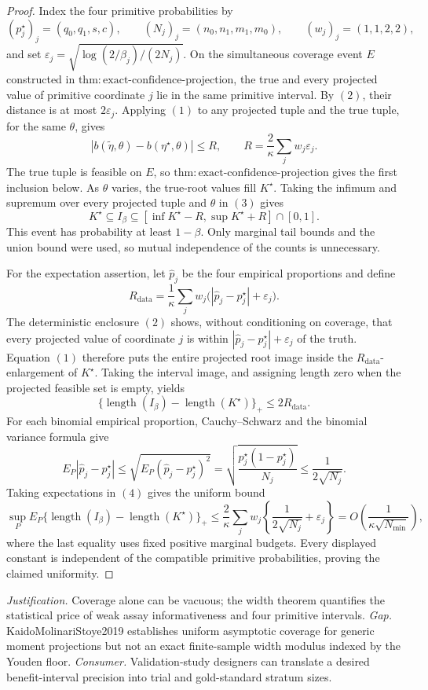 \documentclass{article}
\begin{document}
\begin{proof}
Index the four primitive probabilities by
\[
(p_j^\star)_j=(q_0,q_1,s,c),
\qquad
(N_j)_j=(n_0,n_1,m_1,m_0),
\qquad
(w_j)_j=(1,1,2,2),
\]
and set \(\varepsilon_j=\sqrt{\log(2/\beta_j)/(2N_j)}\). On the simultaneous coverage event \(E\) constructed in \(\mathrm{thm:exact\text{-}confidence\text{-}projection}\), the true and every projected value of primitive coordinate \(j\) lie in the same primitive interval. By \((2)\), their distance is at most \(2\varepsilon_j\). Applying \((1)\) to any projected tuple and the true tuple, for the same \(\theta\), gives
\[
|b(\widetilde\eta,\theta)-b(\eta^\star,\theta)|
\leq R,
\qquad
R=\frac2\kappa\sum_jw_j\varepsilon_j.
\tag{3}
\]
The true tuple is feasible on \(E\), so \(\mathrm{thm:exact\text{-}confidence\text{-}projection}\) gives the first inclusion below. As \(\theta\) varies, the true-root values fill \(K^\star\). Taking the infimum and supremum over every projected tuple and \(\theta\) in \((3)\) gives
\[
K^\star\subseteq I_\beta
\subseteq[\inf K^\star-R,\sup K^\star+R]\cap[0,1].
\]
This event has probability at least \(1-\beta\). Only marginal tail bounds and the union bound were used, so mutual independence of the counts is unnecessary.

For the expectation assertion, let \(\widehat p_j\) be the four empirical proportions and define
\[
R_{\mathrm{data}}
=\frac1\kappa\sum_jw_j
\bigl(|\widehat p_j-p_j^\star|+\varepsilon_j\bigr).
\]
The deterministic enclosure \((2)\) shows, without conditioning on coverage, that every projected value of coordinate \(j\) is within \(|\widehat p_j-p_j^\star|+\varepsilon_j\) of the truth. Equation \((1)\) therefore puts the entire projected root image inside the \(R_{\mathrm{data}}\)-enlargement of \(K^\star\). Taking the interval image, and assigning length zero when the projected feasible set is empty, yields
\[
\{\operatorname{length}(I_\beta)-\operatorname{length}(K^\star)\}_+
\leq2R_{\mathrm{data}}.
\tag{4}
\]
For each binomial empirical proportion, Cauchy--Schwarz and the binomial variance formula give
\[
E_P|\widehat p_j-p_j^\star|
\leq\sqrt{E_P(\widehat p_j-p_j^\star)^2}
=\sqrt{\frac{p_j^\star(1-p_j^\star)}{N_j}}
\leq\frac1{2\sqrt{N_j}}.
\]
Taking expectations in \((4)\) gives the uniform bound
\[
\sup_P E_P
\{\operatorname{length}(I_\beta)-\operatorname{length}(K^\star)\}_+
\leq\frac2\kappa\sum_jw_j
\left\{\frac1{2\sqrt{N_j}}+\varepsilon_j\right\}
=O\!\left(\frac1{\kappa\sqrt{N_{\min}}}\right),
\]
where the last equality uses fixed positive marginal budgets. Every displayed constant is independent of the compatible primitive probabilities, proving the claimed uniformity.
\end{proof}
\par\smallskip\noindent \textit{Justification.} Coverage alone can be vacuous; the width theorem quantifies the statistical price of weak assay informativeness and four primitive intervals. \textit{Gap.} KaidoMolinariStoye2019 establishes uniform asymptotic coverage for generic moment projections but not an exact finite-sample width modulus indexed by the Youden floor. \textit{Consumer.} Validation-study designers can translate a desired benefit-interval precision into trial and gold-standard stratum sizes.
\end{document}
